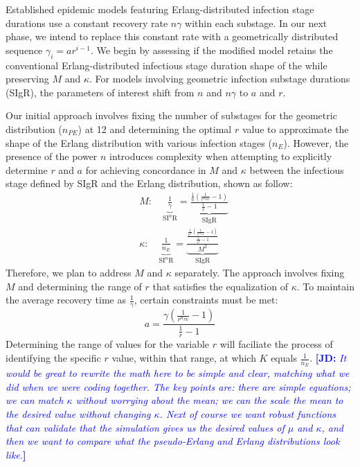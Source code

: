 \documentclass[12pt]{article}
\newcommand{\comment}{}
\renewcommand{\comment}{\nocomment}
\renewcommand{\comment}{\showcomment}
\newcommand{\showcomment}[3]{\textcolor{#1}{\textbf{[#2: }\textsl{#3}\textbf{]}}}
\newcommand{\nocomment}[3]{}
\newcommand{\jd}[1]{\comment{blue}{JD}{#1}}
\begin{document}
Established epidemic models featuring Erlang-distributed infection stage durations use a constant recovery rate $n\gamma$ within each substage. In our next phase, we intend to replace this constant rate with a geometrically distributed sequence $\gamma_i = ar^{i-1}$. We begin by assessing if the modified model retains the conventional Erlang-distributed infectious stage duration shape of the while preserving $M$ and $\kappa$. For models involving geometric infection substage durations (SIgR), the parameters of interest shift from $n$ and $n\gamma$ to $a$ and $r$.

Our initial approach involves fixing the number of substages for the geometric distribution ($n_{PE}$) at 12 and determining the optimal $r$ value to approximate the shape of the Erlang distribution with various infection stages ($n_E$). However, the presence of the power $n$ introduces complexity when attempting to explicitly determine $r$ and $a$ for achieving concordance in $M$ and $\kappa$ between the infectious stage defined by SIgR and the Erlang distribution, shown as follow: 
\begin{align*}
    &M: \quad \underbrace{\frac{1}{\gamma}}_{\text{SI$^n$R}} = \underbrace{\frac{\frac{1}{a} (\frac{1}{r^{n_{PE}}}-1)}{\frac{1}{r}-1}}_{\text{SIgR}} \\
    &\kappa: \quad \underbrace{\frac{1}{n_E}}_{\text{SI$^n$R}} = \underbrace{\frac{\frac{\frac{1}{a^2} (\frac{1}{r^{2n_{PE}}}-1)}{\frac{1}{r^2}-1}}{M^2}}_{\text{SIgR}}
\end{align*}
Therefore, we plan to address $M$ and $\kappa$ separately. The approach involves fixing $M$ and determining the range of $r$ that satisfies the equalization of $\kappa$. To maintain the average recovery time as $\frac{1}{\gamma}$, certain constraints must be met: 
\begin{equation*}
    a = \frac{\gamma (\frac{1}{r^{n_{PE}}}-1)}{\frac{1}{r}-1}
\end{equation*}
Determining the range of values for the variable $r$ will faciliate the process of identifying the specific $r$ value, within that range, at which $K$ equals $\frac{1}{n_E}$.
\jd{It would be great to rewrite the math here to be simple and clear, matching what we did when we were coding together. The key points are: there are simple equations; we can match $\kappa$ without worrying about the mean; we can the scale the mean to the desired value without changing $\kappa$. Next of course we want robust functions that can validate that the simulation gives us the desired values of $\mu$ and $\kappa$, and then we want to compare what the pseudo-Erlang and Erlang distributions look like.}
\end{document}
